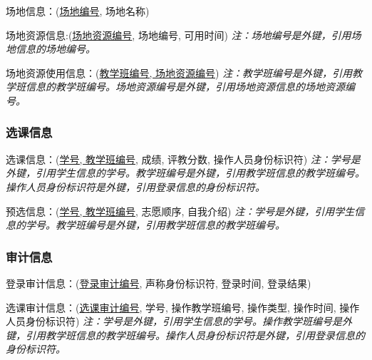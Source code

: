 \textsf{场地信息：}(\uline{场地编号}, 场地名称)

\textsf{场地资源信息:}(\uline{场地资源编号}, 场地编号, 可用时间)
\textsl{注：场地编号是外键，引用场地信息的场地编号。}

\textsf{场地资源使用信息：}(\uline{教学班编号, 场地资源编号})
\textsl{注：教学班编号是外键，引用教学班信息的教学班编号。场地资源编号是外键，引用场地资源信息的场地资源编号。}

\subsubsection{选课信息}
\textsf{选课信息：}(\uline{学号, 教学班编号}, 成绩, 评教分数, 操作人员身份标识符)
\textsl{注：学号是外键，引用学生信息的学号。教学班编号是外键，引用教学班信息的教学班编号。操作人员身份标识符是外键，引用登录信息的身份标识符。}

\textsf{预选信息：}(\uline{学号, 教学班编号}, 志愿顺序, 自我介绍)
\textsl{注：学号是外键，引用学生信息的学号。教学班编号是外键，引用教学班信息的教学班编号。}

\subsubsection{审计信息}
\textsf{登录审计信息：}(\uline{登录审计编号}, 声称身份标识符, 登录时间, 登录结果)

\textsf{选课审计信息：}(\uline{选课审计编号}, 学号, 操作教学班编号, 操作类型, 操作时间, 操作人员身份标识符)
\textsl{注：学号是外键，引用学生信息的学号。操作教学班编号是外键，引用教学班信息的教学班编号。操作人员身份标识符是外键，引用登录信息的身份标识符。}
